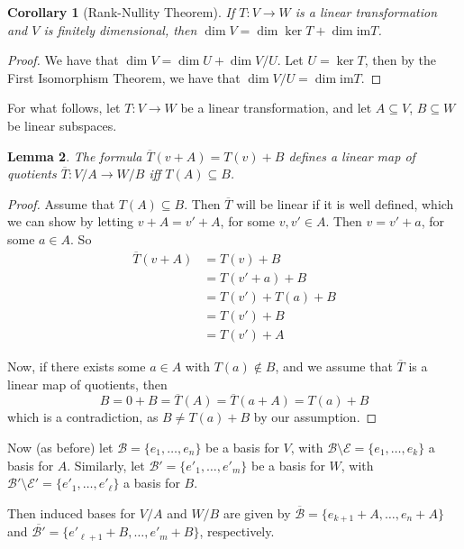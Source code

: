 \documentclass[10pt,fleqn]{article}
\newcommand{\im}{\mathrm{im}}
\newcommand{\basis}{\mathcal{B}}
\newcommand{\varbasis}{\mathcal{E}}
\theoremstyle{definition} \newtheorem{defn}{Definition}[section]
\theoremstyle{plain}      \newtheorem{thm}[defn]{Theorem}
\theoremstyle{plain}      \newtheorem{prop}[defn]{Proposition}
\theoremstyle{plain}      \newtheorem{lem}[defn]{Lemma}
\theoremstyle{plain}      \newtheorem{cor}[defn]{Corollary}
\theoremstyle{plain}      \newtheorem{ad}[defn]{Addendum}
\theoremstyle{definition} \newtheorem{ex}[defn]{Example}
\theoremstyle{definition} \newtheorem{rem}[defn]{Remark}
\numberwithin{equation}{subsection}
\begin{document}
\begin{cor}[Rank-Nullity Theorem]
    If $T:V\to W$ is a linear transformation and $V$ is finitely dimensional, then $\dim V=\dim\ker T+\dim\im T$.
\end{cor}

\begin{proof}
    We have that $\dim V=\dim U+\dim V/U$.
    Let $U=\ker T$, then by the First Isomorphism Theorem, we have that $\dim V/U=\dim\im T$.
\end{proof}

For what follows, let $T:V\to W$ be a linear transformation, and let $A\subseteq V$, $B\subseteq W$ be linear subspaces.

\begin{lem}
    The formula $\overline{T}(v+A)=T(v)+B$ defines a linear map of quotients $\overline{T}:V/A\to W/B$ iff $T(A)\subseteq B$.
\end{lem}

\begin{proof}
    Assume that $T(A)\subseteq B$.
    Then $\overline{T}$ will be linear if it is well defined, which we can show by letting $v+A=v'+A$, for some $v,v'\in A$.
    Then $v=v'+a$, for some $a\in A$.
    So
    \begin{align*}
        \overline{T}(v+A)
        &=
        T(v)+B\\
        &=
        T(v'+a)+B\\
        &=
        T(v')+T(a)+B\\
        &=
        T(v')+B\\
        &=
        T(v')+A
    \end{align*}

    Now, if there exists some $a\in A$ with $T(a)\not\in B$, and we assume that $\overline{T}$ is a linear map of quotients, then
    \[
        B=
        0+B=
        \overline{T}(A)=
        \overline{T}(a+A)=
        T(a)+B
    \]
    which is a contradiction, as $B\neq T(a)+B$ by our assumption.
\end{proof}

Now (as before) let $\basis=\{e_1,\ldots,e_n\}$ be a basis for $V$, with $\basis\setminus\varbasis=\{e_1,\ldots,e_k\}$ a basis for $A$.
Similarly, let $\basis'=\{e'_1,\ldots,e'_m\}$ be a basis for $W$, with $\basis'\setminus\varbasis'=\{e'_1,\ldots,e'_{\ell}\}$ a basis for $B$.

Then induced bases for $V/A$ and $W/B$ are given by $\overline{\basis}=\{e_{k+1}+A,\ldots,e_n+A\}$ and $\overline{\basis'}=\{e'_{\ell+1}+B,\ldots,e'_m+B\}$, respectively.
\end{document}
